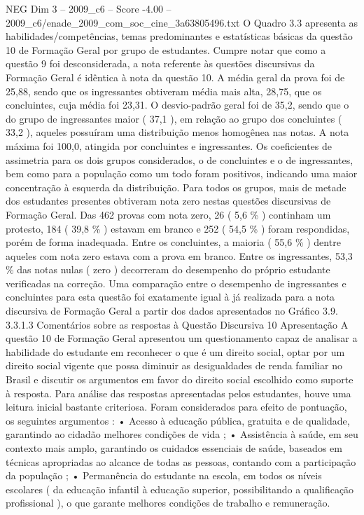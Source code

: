 \begin{textsample}{NEG Dim 3 – 2009\_c6 – Score -4.00 – 2009\_c6/enade\_2009\_com\_soc\_cine\_3a63805496.txt}
O Quadro 3.3 apresenta as habilidades/competências, temas predominantes e estatísticas básicas da questão 10 de Formação Geral por grupo de estudantes.
Cumpre notar que como a questão 9 foi desconsiderada, a nota referente às questões discursivas da Formação Geral é idêntica à nota da questão 10.
A média geral da prova foi de 25,88, sendo que os ingressantes obtiveram média mais alta, 28,75, que os concluintes, cuja média foi 23,31.
O desvio-padrão geral foi de 35,2, sendo que o do grupo de ingressantes maior ( 37,1 ), em relação ao grupo dos concluintes ( 33,2 ), aqueles possuíram uma distribuição menos homogênea nas notas.
A nota máxima foi 100,0, atingida por concluintes e ingressantes.
Os coeficientes de assimetria para os dois grupos considerados, o de concluintes e o de ingressantes, bem como para a população como um todo foram positivos, indicando uma maior concentração à esquerda da distribuição.
Para todos os grupos, mais de metade dos estudantes presentes obtiveram nota zero nestas questões discursivas de Formação Geral.
Das 462 provas com nota zero, 26 ( 5,6 \% ) continham um protesto, 184 ( 39,8 \% ) estavam em branco e 252 ( 54,5 \% ) foram respondidas, porém de forma inadequada.
Entre os concluintes, a maioria ( 55,6 \% ) dentre aqueles com nota zero estava com a prova em branco.
Entre os ingressantes, 53,3 \% das notas nulas ( zero ) decorreram do desempenho do próprio estudante verificadas na correção.
Uma comparação entre o desempenho de ingressantes e concluintes para esta questão foi exatamente igual à já realizada para a nota discursiva de Formação Geral a partir dos dados apresentados no Gráfico 3.9. 3.3.1.3 Comentários sobre as respostas à Questão Discursiva 10 Apresentação A questão 10 de Formação Geral apresentou um questionamento capaz de analisar a habilidade do estudante em reconhecer o que é um direito social, optar por um direito social vigente que possa diminuir as desigualdades de renda familiar no Brasil e discutir os argumentos em favor do direito social escolhido como suporte à resposta.
Para análise das respostas apresentadas pelos estudantes, houve uma leitura inicial bastante criteriosa.
Foram considerados para efeito de pontuação, os seguintes argumentos : • Acesso à educação pública, gratuita e de qualidade, garantindo ao cidadão melhores condições de vida ; • Assistência à saúde, em seu contexto mais amplo, garantindo os cuidados essenciais de saúde, baseados em técnicas apropriadas ao alcance de todas as pessoas, contando com a participação da população ; • Permanência do estudante na escola, em todos os níveis escolares ( da educação infantil à educação superior, possibilitando a qualificação profissional ), o que garante melhores condições de trabalho e remuneração.

\end{textsample}
